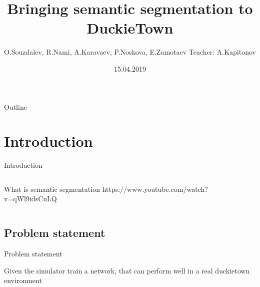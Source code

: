 \documentclass{beamer}
\title[Bringing semantic segmentation to DuckieTown]{Bringing semantic segmentation to DuckieTown}
\author[ITMO University]{O.Souzdalev, R.Nami, A.Karavaev, P.Noskova, E.Zamotaev Teacher: A.Kapitonov}
\date{15.04.2019}
\begin{document}
\begin{frame}
  \titlepage
\end{frame}

\begin{frame}{Outline}
  \tableofcontents
\end{frame}

\section{Introduction}

\begin{frame}{Introduction}

\begin{columns}
What is semantic segmentation
https://www.youtube.com/watch?v=qWl9idsCuLQ



\end{columns}



\end{frame}

\subsection{Problem statement}
\begin{frame}{Problem statement}

Given the simulator train a network, that can perform well in a real duckietown environment

\end{frame}
\end{document}
